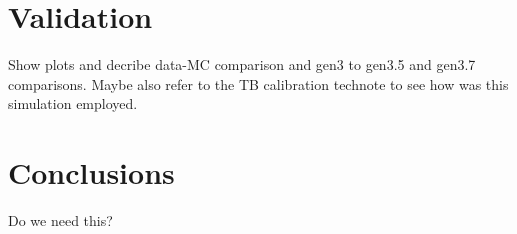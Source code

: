 \documentclass[12pt]{article}
\begin{document}
\section{Validation}
Show plots and decribe data-MC comparison and gen3 to gen3.5 and gen3.7 comparisons. Maybe also refer to the TB calibration technote to see how was this simulation employed.

\section{Conclusions}
Do we need this?



\end{document}
